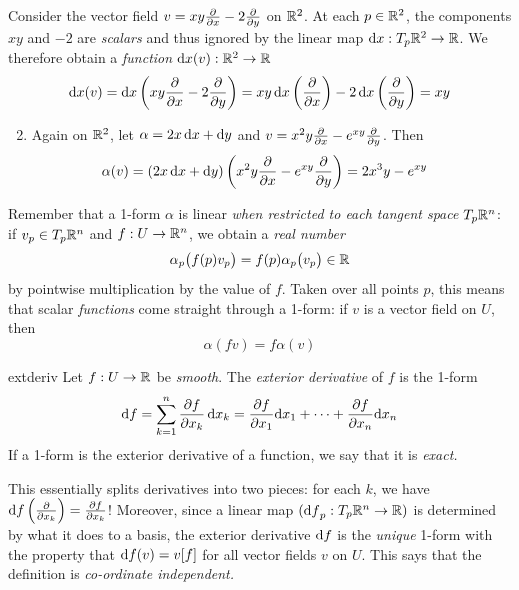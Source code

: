 \begin{examples}{}{}
\exstart Consider the vector field $v=xy\partials x-2\partials y$ on $\R^2$. At each $p\in\R^2$, the components $xy$ and $-2$ are \emph{scalars} and thus ignored by the linear map $\dx:T_p\R^2\to\R$. We therefore obtain a \emph{function} $\dx(v):\R^2\to\R$
\[\dx(v)=\dx\left(xy\partials x-2\partials y\right)=xy\,\dx\left(\partials x\right)-2\,\dx\left(\partials y\right) =xy\]
\begin{enumerate}\setcounter{enumi}{1}
  \item Again on $\R^2$, let $\alpha=2x\,\dx+\dy$ and $v=x^2y\partials x-e^{xy}\partials y$. Then
	\begin{align*}
	\alpha(v)&=(2x\,\dx+\dy)\left(x^2y\partials x-e^{xy}\partials y\right)
	=2x^3y-e^{xy}
	\end{align*}
\end{enumerate}
\end{examples}

\label{pg:formlinearfunction}
Remember that a 1-form $\alpha$ is linear \emph{when restricted to each tangent space} $T_p\R^n$: if $v_p\in T_p\R^n$ and $f:U\to\R^n$, we obtain a \emph{real number}
\[\alpha_p\bigl(f(p)v_p\bigr)=f(p)\alpha_p\bigl(v_p\bigr)\in\R\]
by pointwise multiplication by the value of $f$. Taken over all points $p$, this means that scalar \emph{functions} come straight through a 1-form: if $v$ is a vector field on $U$, then
\[\alpha(fv)=f\alpha(v)\] 


\begin{defn}{}{extderiv}
Let $f:U\to\R$ be \emph{smooth}. The \emph{exterior derivative} of $f$ is the 1-form
\[\df=\sum_{k=1}^n\partials[f]{x_k}\,\dx_k=\partials[f]{x_1}\dx_1+\cdots+\partials[f]{x_n}\dx_n\]
If a 1-form is the exterior derivative of a function, we say that it is \emph{exact.}
\end{defn}

This essentially splits derivatives into two pieces: for each $k$, we have $\df\left(\partials{x_k}\right)=\partials[f]{x_k}$!
Moreover, since a linear map $(\df_p:T_p\R^n\to\R)$ is determined by what it does to a basis, the exterior derivative $\df$ is the \emph{unique} 1-form with the property that $\df(v)=v[f]$ for all vector fields $v$ on $U$. This says that the definition is \emph{co-ordinate independent.}


